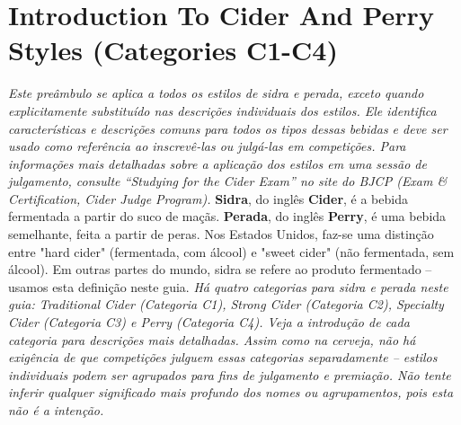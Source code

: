 \section*{Introduction To Cider And Perry Styles (Categories C1-C4)}
\textit{Este preâmbulo se aplica a todos os estilos de sidra e perada, exceto quando explicitamente substituído nas descrições individuais dos estilos. Ele identifica características e descrições comuns para todos os tipos dessas bebidas e deve ser usado como referência ao inscrevê-las ou julgá-las em competições. Para informações mais detalhadas sobre a aplicação dos estilos em uma sessão de julgamento, consulte “Studying for the Cider Exam” no site do BJCP (Exam & Certification, Cider Judge Program).}
\textbf{Sidra}, do inglês \textbf{Cider}, é a bebida fermentada a partir do suco de maçãs. \textbf{Perada}, do inglês \textbf{Perry}, é uma bebida semelhante, feita a partir de peras. Nos Estados Unidos, faz-se uma distinção entre "hard cider" (fermentada, com álcool) e "sweet cider" (não fermentada, sem álcool). Em outras partes do mundo, sidra se refere ao produto fermentado – usamos esta definição neste guia. 
\textit{Há quatro categorias para sidra e perada neste guia: Traditional Cider (Categoria C1), Strong Cider (Categoria C2), Specialty Cider (Categoria C3) e Perry (Categoria C4). Veja a introdução de cada categoria para descrições mais detalhadas. Assim como na cerveja, não há exigência de que competições julguem essas categorias separadamente – estilos individuais podem ser agrupados para fins de julgamento e premiação. Não tente inferir qualquer significado mais profundo dos nomes ou agrupamentos, pois esta não é a intenção.}
